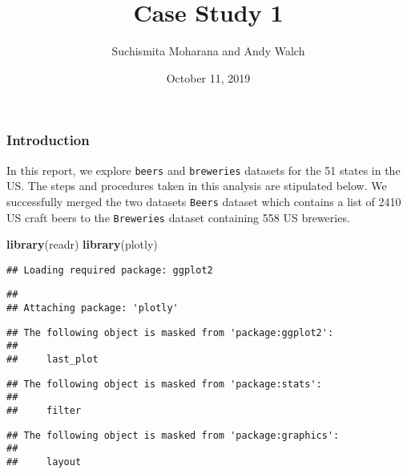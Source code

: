 \documentclass[]{article}
\title{Case Study 1}
\author{Suchismita Moharana and Andy Walch}
\date{October 11, 2019}
\newenvironment{Shaded}{\begin{snugshade}}{\end{snugshade}}
\newcommand{\DataTypeTok}[1]{\textcolor[rgb]{0.13,0.29,0.53}{#1}}
\newcommand{\KeywordTok}[1]{\textcolor[rgb]{0.13,0.29,0.53}{\textbf{#1}}}
\newcommand{\NormalTok}[1]{#1}
\newcommand{\OperatorTok}[1]{\textcolor[rgb]{0.81,0.36,0.00}{\textbf{#1}}}
\newcommand{\OtherTok}[1]{\textcolor[rgb]{0.56,0.35,0.01}{#1}}
\begin{document}
\maketitle

\hypertarget{introduction}{%
\subsubsection{Introduction}\label{introduction}}

In this report, we explore \texttt{beers} and \texttt{breweries}
datasets for the 51 states in the US. The steps and procedures taken in
this analysis are stipulated below. We successfully merged the two
datasets \texttt{Beers} dataset which contains a list of 2410 US craft
beers to the \texttt{Breweries} dataset containing 558 US breweries.

\begin{Shaded}
\end{Shaded}

\begin{Shaded}
\begin{Highlighting}[]
\KeywordTok{library}\NormalTok{(readr)}
\KeywordTok{library}\NormalTok{(plotly)}
\end{Highlighting}
\end{Shaded}

\begin{verbatim}
## Loading required package: ggplot2
\end{verbatim}

\begin{verbatim}
## 
## Attaching package: 'plotly'
\end{verbatim}

\begin{verbatim}
## The following object is masked from 'package:ggplot2':
## 
##     last_plot
\end{verbatim}

\begin{verbatim}
## The following object is masked from 'package:stats':
## 
##     filter
\end{verbatim}

\begin{verbatim}
## The following object is masked from 'package:graphics':
## 
##     layout
\end{verbatim}
\end{document}
